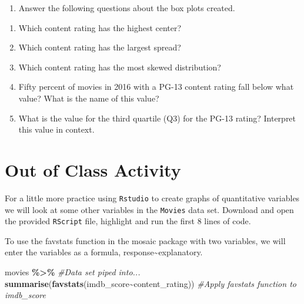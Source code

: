 \documentclass[
]{report}
\newenvironment{Shaded}{\begin{snugshade}}{\end{snugshade}}
\newcommand{\CommentTok}[1]{\textcolor[rgb]{0.56,0.35,0.01}{\textit{#1}}}
\newcommand{\KeywordTok}[1]{\textcolor[rgb]{0.13,0.29,0.53}{\textbf{#1}}}
\newcommand{\NormalTok}[1]{#1}
\newcommand{\OperatorTok}[1]{\textcolor[rgb]{0.81,0.36,0.00}{\textbf{#1}}}
\newcommand{\StringTok}[1]{\textcolor[rgb]{0.31,0.60,0.02}{#1}}
\providecommand{\tightlist}{%
  \setlength{\itemsep}{0pt}\setlength{\parskip}{0pt}}
\begin{document}
\newpage

\begin{enumerate}
\def\labelenumi{\arabic{enumi}.}
\setcounter{enumi}{13}
\tightlist
\item
  Answer the following questions about the box plots created.
\end{enumerate}

\begin{enumerate}
\def\labelenumi{\alph{enumi}.}
\item
  Which content rating has the highest center?
  \vspace{0.2in}
\item
  Which content rating has the largest spread?
  \vspace{0.2in}
\item
  Which content rating has the most skewed distribution?
  \vspace{0.2in}
\item
  Fifty percent of movies in 2016 with a PG-13 content rating fall below what value? What is the name of this value?
  \vspace{0.4in}
\item
  What is the value for the third quartile (Q3) for the PG-13 rating? Interpret this value in context.
  \vspace{.8in}
\end{enumerate}

\hypertarget{out-of-class-activity}{%
\section{Out of Class Activity}\label{out-of-class-activity}}

For a little more practice using \texttt{Rstudio} to create graphs of quantitative variables we will look at some other variables in the \texttt{Movies} data set. Download and open the provided \texttt{RScript} file, highlight and run the first 8 lines of code.

To use the favstats function in the mosaic package with two variables, we will enter the variables as a formula, response\textasciitilde explanatory.

\begin{Shaded}
\begin{Highlighting}[]
\NormalTok{movies }\OperatorTok{\%\textgreater{}\%}\StringTok{ }\CommentTok{\#Data set piped into...}
\StringTok{  }\KeywordTok{summarise}\NormalTok{(}\KeywordTok{favstats}\NormalTok{(imdb\_score}\OperatorTok{\textasciitilde{}}\NormalTok{content\_rating)) }\CommentTok{\#Apply favstats function to imdb\_score}
\end{Highlighting}
\end{Shaded}
\end{document}
